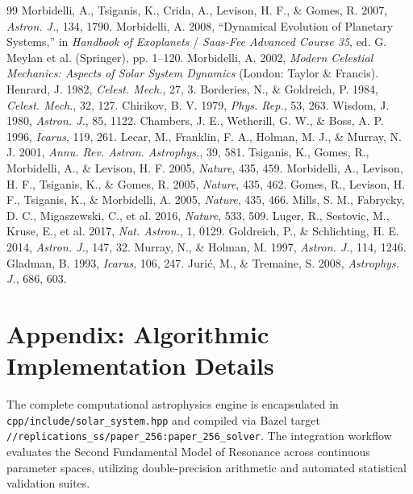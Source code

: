 \documentclass[11pt,a4paper]{article}
\begin{document}
\begin{thebibliography}{99}
 Morbidelli, A., Tsiganis, K., Crida, A., Levison, H. F., \& Gomes, R. 2007, \textit{Astron. J.}, 134, 1790.
 Morbidelli, A. 2008, ``Dynamical Evolution of Planetary Systems,'' in \textit{Handbook of Exoplanets} / \textit{Saas-Fee Advanced Course 35}, ed. G. Meylan et al. (Springer), pp. 1--120.
 Morbidelli, A. 2002, \textit{Modern Celestial Mechanics: Aspects of Solar System Dynamics} (London: Taylor \& Francis).
 Henrard, J. 1982, \textit{Celest. Mech.}, 27, 3.
 Borderies, N., \& Goldreich, P. 1984, \textit{Celest. Mech.}, 32, 127.
 Chirikov, B. V. 1979, \textit{Phys. Rep.}, 53, 263.
 Wisdom, J. 1980, \textit{Astron. J.}, 85, 1122.
 Chambers, J. E., Wetherill, G. W., \& Boss, A. P. 1996, \textit{Icarus}, 119, 261.
 Lecar, M., Franklin, F. A., Holman, M. J., \& Murray, N. J. 2001, \textit{Annu. Rev. Astron. Astrophys.}, 39, 581.
 Tsiganis, K., Gomes, R., Morbidelli, A., \& Levison, H. F. 2005, \textit{Nature}, 435, 459.
 Morbidelli, A., Levison, H. F., Tsiganis, K., \& Gomes, R. 2005, \textit{Nature}, 435, 462.
 Gomes, R., Levison, H. F., Tsiganis, K., \& Morbidelli, A. 2005, \textit{Nature}, 435, 466.
 Mills, S. M., Fabrycky, D. C., Migaszewski, C., et al. 2016, \textit{Nature}, 533, 509.
 Luger, R., Sestovic, M., Kruse, E., et al. 2017, \textit{Nat. Astron.}, 1, 0129.
 Goldreich, P., \& Schlichting, H. E. 2014, \textit{Astron. J.}, 147, 32.
 Murray, N., \& Holman, M. 1997, \textit{Astron. J.}, 114, 1246.
 Gladman, B. 1993, \textit{Icarus}, 106, 247.
 Juri\'c, M., \& Tremaine, S. 2008, \textit{Astrophys. J.}, 686, 603.
\end{thebibliography}

\appendix
\section*{Appendix: Algorithmic Implementation Details}
The complete computational astrophysics engine is encapsulated in \texttt{cpp/include/solar\_system.hpp} and compiled via Bazel target \texttt{//replications\_ss/paper\_256:paper\_256\_solver}. The integration workflow evaluates the Second Fundamental Model of Resonance across continuous parameter spaces, utilizing double-precision arithmetic and automated statistical validation suites.
\end{document}
